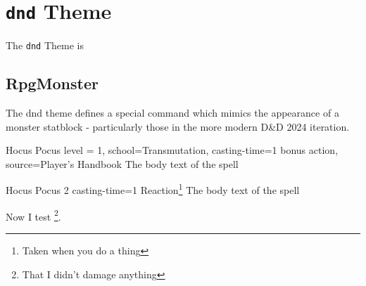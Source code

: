 \chapter{\texttt{dnd} Theme}

	The \texttt{dnd} Theme is 

	\section{RpgMonster}

		The dnd theme defines a special command which mimics the appearance of a monster statblock - particularly those in the more modern D\&D 2024 iteration. 

			


	\begin{RpgSpell}{Hocus Pocus}{
		level = 1,
		school=Transmutation,
		casting-time={1 bonus action},
		source={Player's Handbook}
	}
		The body text of the spell

	\end{RpgSpell}

	\begin{RpgSpell}{Hocus Pocus 2}{
		casting-time={1 Reaction\footnote{Taken when you do a thing}}
	}
		The body text of the spell
		\Blindtext
	\end{RpgSpell}

	Now I test \footnote{That I didn't damage anything}.







	
